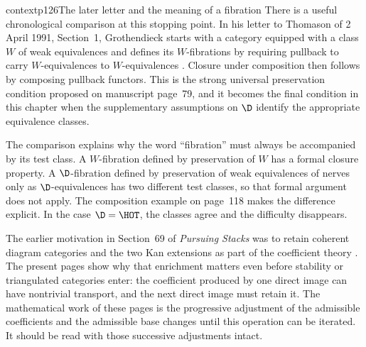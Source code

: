 \begin{dcomment}{context}{p126}{The later letter and the meaning of a fibration}
There is a useful chronological comparison at this stopping point. In his letter to Thomason of 2 April 1991, Section~1, Grothendieck starts with a category equipped with a class $W$ of weak equivalences and defines its $W$-fibrations by requiring pullback to carry $W$-equivalences to $W$-equivalences \citep{Grothendieck1991Letter}. Closure under composition then follows by composing pullback functors. This is the strong universal preservation condition proposed on manuscript page~79, and it becomes the final condition in this chapter when the supplementary assumptions on $\D$ identify the appropriate equivalence classes.

The comparison explains why the word ``fibration'' must always be accompanied by its test class. A $W$-fibration defined by preservation of $W$ has a formal closure property. A $\D$-fibration defined by preservation of weak equivalences of nerves only as $\D$-equivalences has two different test classes, so that formal argument does not apply. The composition example on page~118 makes the difference explicit. In the case $\D=\HOT$, the classes agree and the difficulty disappears.

The earlier motivation in Section~69 of \emph{Pursuing Stacks} was to retain coherent diagram categories and the two Kan extensions as part of the coefficient theory \citep{Grothendieck1983}. The present pages show why that enrichment matters even before stability or triangulated categories enter: the coefficient produced by one direct image can have nontrivial transport, and the next direct image must retain it. The mathematical work of these pages is the progressive adjustment of the admissible coefficients and the admissible base changes until this operation can be iterated. It should be read with those successive adjustments intact.
\end{dcomment}

